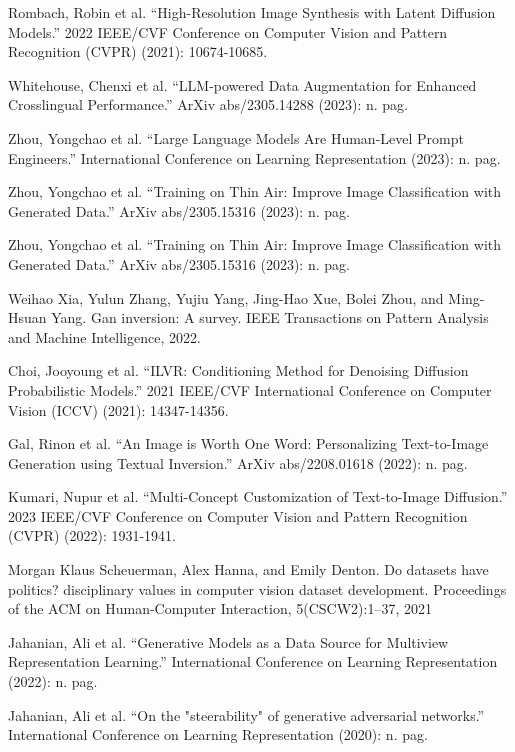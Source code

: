 \documentclass[preprint,12pt,authoryear]{elsarticle}
\begin{document}
\begin{thebibliography}{00}
Rombach, Robin et al. “High-Resolution Image Synthesis with Latent Diffusion Models.” 2022 IEEE/CVF Conference on Computer Vision and Pattern Recognition (CVPR) (2021): 10674-10685.

Whitehouse, Chenxi et al. “LLM-powered Data Augmentation for Enhanced Crosslingual Performance.” ArXiv abs/2305.14288 (2023): n. pag.

Zhou, Yongchao et al. “Large Language Models Are Human-Level Prompt Engineers.” International Conference on Learning Representation  (2023): n. pag.

Zhou, Yongchao et al. “Training on Thin Air: Improve Image Classification with Generated Data.” ArXiv abs/2305.15316 (2023): n. pag.

Zhou, Yongchao et al. “Training on Thin Air: Improve Image Classification with Generated Data.” ArXiv abs/2305.15316 (2023): n. pag.

Weihao Xia, Yulun Zhang, Yujiu Yang, Jing-Hao Xue, Bolei Zhou, and Ming-Hsuan Yang. Gan
inversion: A survey. IEEE Transactions on Pattern Analysis and Machine Intelligence, 2022.

Choi, Jooyoung et al. “ILVR: Conditioning Method for Denoising Diffusion Probabilistic Models.” 2021 IEEE/CVF International Conference on Computer Vision (ICCV) (2021): 14347-14356.

Gal, Rinon et al. “An Image is Worth One Word: Personalizing Text-to-Image Generation using Textual Inversion.” ArXiv abs/2208.01618 (2022): n. pag.

Kumari, Nupur et al. “Multi-Concept Customization of Text-to-Image Diffusion.” 2023 IEEE/CVF Conference on Computer Vision and Pattern Recognition (CVPR) (2022): 1931-1941.

Morgan Klaus Scheuerman, Alex Hanna, and Emily Denton. Do datasets have politics?
disciplinary values in computer vision dataset development. Proceedings of the ACM on
Human-Computer Interaction, 5(CSCW2):1–37, 2021

Jahanian, Ali et al. “Generative Models as a Data Source for Multiview Representation Learning.” International Conference on Learning Representation (2022): n. pag. 

Jahanian, Ali et al. “On the "steerability" of generative adversarial networks.” International Conference on Learning Representation  (2020): n. pag.


\end{thebibliography}
\end{document}
